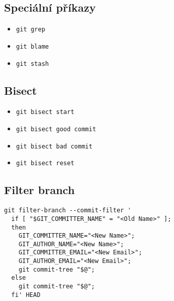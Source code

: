 \documentclass[10pt,twocolumn]{article}
\begin{document}
\subsection{Speciální příkazy}

\begin{itemize}
	\item \texttt{git grep}
	\item \texttt{git blame}
	\item \texttt{git stash}
\end{itemize}

\subsection{Bisect}

\begin{itemize}
	\item \texttt{git bisect start}
	\item \texttt{git bisect good commit}
	\item \texttt{git bisect bad commit}
	\item \texttt{git bisect reset}
\end{itemize}

\subsection{Filter branch}

\begin{verbatim}
git filter-branch --commit-filter '
  if [ "$GIT_COMMITTER_NAME" = "<Old Name>" ];
  then
    GIT_COMMITTER_NAME="<New Name>";
    GIT_AUTHOR_NAME="<New Name>";
    GIT_COMMITTER_EMAIL="<New Email>";
    GIT_AUTHOR_EMAIL="<New Email>";
    git commit-tree "$@";
  else
    git commit-tree "$@";
  fi' HEAD
\end{verbatim}

%
\end{document}
